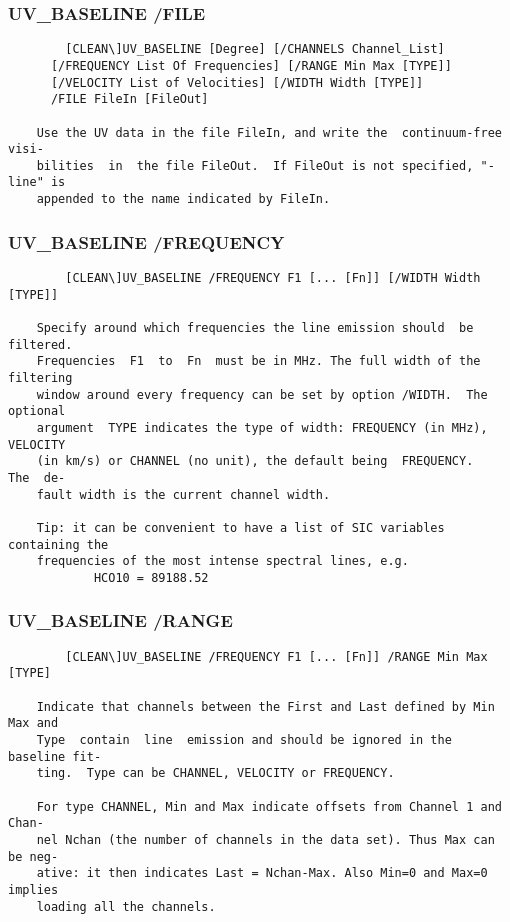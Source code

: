 \subsubsection{UV\_BASELINE /FILE}
\begin{verbatim}
        [CLEAN\]UV_BASELINE [Degree] [/CHANNELS Channel_List]
      [/FREQUENCY List Of Frequencies] [/RANGE Min Max [TYPE]]
      [/VELOCITY List of Velocities] [/WIDTH Width [TYPE]]
      /FILE FileIn [FileOut]

    Use the UV data in the file FileIn, and write the  continuum-free  visi-
    bilities  in  the file FileOut.  If FileOut is not specified, "-line" is
    appended to the name indicated by FileIn.

\end{verbatim}
\subsubsection{UV\_BASELINE /FREQUENCY}
\begin{verbatim}
        [CLEAN\]UV_BASELINE /FREQUENCY F1 [... [Fn]] [/WIDTH Width [TYPE]]

    Specify around which frequencies the line emission should  be  filtered.
    Frequencies  F1  to  Fn  must be in MHz. The full width of the filtering
    window around every frequency can be set by option /WIDTH.  The optional
    argument  TYPE indicates the type of width: FREQUENCY (in MHz), VELOCITY
    (in km/s) or CHANNEL (no unit), the default being  FREQUENCY.   The  de-
    fault width is the current channel width.

    Tip: it can be convenient to have a list of SIC variables containing the
    frequencies of the most intense spectral lines, e.g.
            HCO10 = 89188.52

\end{verbatim}
\subsubsection{UV\_BASELINE /RANGE}
\begin{verbatim}
        [CLEAN\]UV_BASELINE /FREQUENCY F1 [... [Fn]] /RANGE Min Max [TYPE]

    Indicate that channels between the First and Last defined by Min Max and
    Type  contain  line  emission and should be ignored in the baseline fit-
    ting.  Type can be CHANNEL, VELOCITY or FREQUENCY.

    For type CHANNEL, Min and Max indicate offsets from Channel 1 and  Chan-
    nel Nchan (the number of channels in the data set). Thus Max can be neg-
    ative: it then indicates Last = Nchan-Max. Also Min=0 and Max=0  implies
    loading all the channels.

\end{verbatim}
